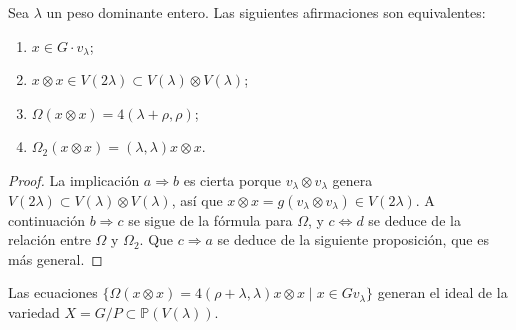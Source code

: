 \documentclass[11pt,fleqn]{article}
\newcommand\PP{\mathbb P}
\newcommand\ot{\otimes}
\begin{document}
\begin{Proposition*}[1.3.2]
Sea $\lambda$ un peso dominante entero. Las siguientes afirmaciones son equivalentes:
\begin{enumerate}[label=(\alph*)]
	\item $x \in G \cdot v_\lambda$;
	\item $x \ot x \in V(2\lambda) \subset V(\lambda) \ot V(\lambda)$;
	\item $\Omega(x \ot x) = 4 (\lambda + \rho, \rho)$;
	\item $\Omega_2(x \ot x) = (\lambda, \lambda) x \ot x$.
\end{enumerate}
\end{Proposition*}
\begin{proof}
	La implicación $a \Rightarrow b$ es cierta porque $v_\lambda \ot v_\lambda$ genera
	$V(2\lambda) \subset V(\lambda) \ot V(\lambda)$, así que $x \ot x = g (v_\lambda \ot
	v_\lambda) \in V(2\lambda)$. A continuación $b \Rightarrow c$ se sigue de la fórmula
	para $\Omega$, y $c \Leftrightarrow d$ se deduce de la relación entre $\Omega$ y
	$\Omega_2$. Que $c \Rightarrow a$ se deduce de la siguiente proposición, que es más
	general.
\end{proof}
\begin{Proposition*}
	Las ecuaciones $\{\Omega(x \ot x) = 4(\rho + \lambda, \lambda)x \ot x \mid x \in
	Gv_\lambda\}$ generan el ideal de la variedad $X = G/P \subset \PP(V(\lambda))$.
\end{Proposition*}
\end{document}
